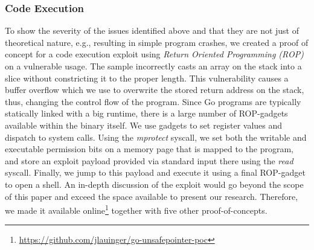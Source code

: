 \subsubsection*{Code Execution}

To show the severity of the issues identified above and that they are not just of theoretical nature, e.g., resulting in simple program crashes, we created a proof of concept for a code execution exploit using \textit{Return Oriented Programming (ROP)} on a vulnerable \unsafe{} usage. %
The sample incorrectly casts an array on the stack into a slice without constricting it to the proper length.
This vulnerability causes a buffer overflow which we use to overwrite the stored return address on the stack, thus, changing the control flow of the program. 
Since Go programs are typically statically linked with a big runtime, there is a large number of ROP-gadgets available within the binary itself. 
We use gadgets to set register values and dispatch to system calls. 
Using the \textit{mprotect} syscall, we set both the writable and executable permission bits on a memory page that is mapped to the program, and store an exploit payload provided via standard input there using the \textit{read} syscall. 
Finally, we jump to this payload and execute it using a final ROP-gadget to open a shell.
An in-depth discussion of the exploit would go beyond the scope of this paper and exceed the space available to present our research.
Therefore, we made it available online\footnote{\url{https://github.com/jlauinger/go-unsafepointer-poc}\label{fn:poc}} together with five other proof-of-concepts. 


